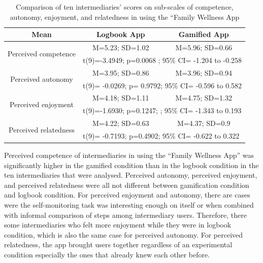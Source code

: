 \begin{table}[h!]
  \begin{center}
    \caption{Comparison of ten intermediaries' scores on sub-scales of competence, autonomy, enjoyment, and relatedness in using the ``Family Wellness App}
    \label{table:imiwellnessinterm}
	\begin{tabular}{|c|c|c|}
		\hline
		Mean &Logbook App&Gamified App\\
		\hline
		 \multirow{2}{*}{Perceived competence}&M=5.23; SD=1.02&M=5.96; SD=0.66\\\cline{2-3} 

		 &\multicolumn{2}{|l|}{t(9)=-3.4949; p=0.0068 ; 95\% CI= -1.204 to -0.258} \\
\hline
		 \multirow{2}{*}{Perceived autonomy}&M=3.95; SD=0.86&M=3.96; SD=0.94\\\cline{2-3} 

		 &\multicolumn{2}{|l|}{t(9)= -0.0269; p= 0.9792; 95\% CI= -0.596 to 0.582} \\
\hline
		 \multirow{2}{*}{Perceived enjoyment}&M=4.18; SD=1.11&M=4.75; SD=1.32\\\cline{2-3} 

		 &\multicolumn{2}{|l|}{t(9)=-1.6930;  p=0.1247; ; 95\% CI= -1.343 to 0.193 } \\
\hline
		 \multirow{2}{*}{Perceived relatedness}&M=4.22; SD=0.63&M=4.37; SD=0.9\\\cline{2-3} 
		 &\multicolumn{2}{|l|}{t(9)= -0.7193; p=0.4902; 95\% CI= -0.622 to 0.322 } \\
\hline
	\end{tabular}
  \end{center}
\end{table}
\newline
Perceived competence of intermediaries in using the ``Family Wellness App'' was significantly higher in the gamified condition than in the logbook condition in the ten intermediaries that were analysed. Perceived autonomy, perceived enjoyment, and perceived relatedness were all not different between gamification condition and logbook condition. For perceived enjoyment and autonomy, there are cases were the self-monitoring task was interesting enough on itself or when combined with informal comparison of steps among intermediary users. Therefore, there some intermediaries who felt more enjoyment while they were in logbook condition, which is also the same case for perceived autonomy. For perceived relatedness, the app brought users together regardless of an experimental condition especially the ones that already knew each other before.  \newline
